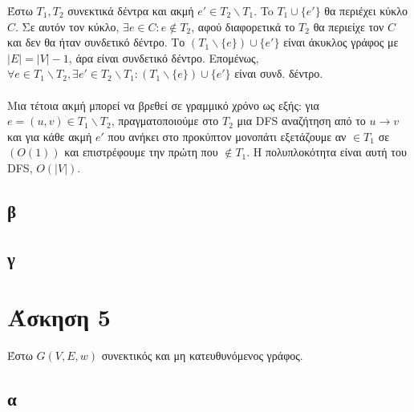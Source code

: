 \documentclass[12pt,a4paper]{article}
\begin{document}
  Έστω \(T_1, T_2\) συνεκτικά δέντρα και ακμή \(e' \in T_2 \backslash T_1\).
  To \(T_1 \cup \{e'\}\) θα περιέχει κύκλο \(C\). Σε αυτόν τον κύκλο, \(\exists
  e \in C: e \notin T_2\), αφού διαφορετικά το \(Τ_2\) θα περιείχε τον \(C\)
  και δεν θα ήταν συνδετικό δέντρο. Το \((T_1 \backslash \{e\}) \cup \{e'\} \)
  είναι άκυκλος γράφος με \(|E| = |V| - 1\), άρα είναι συνδετικό δέντρο.
  Επομένως, \(\forall e \in T_1 \backslash T_2, \exists e' \in T_2 \backslash
  T_1: (T_1 \backslash \{e\}) \cup \{e'\}\) είναι συνδ. δέντρο.
  \\
  \\
  Μια τέτοια ακμή μπορεί να βρεθεί σε γραμμικό χρόνο ως εξής: για \(e = (u, v)
  \in T_1 \backslash T_2 \), πραγματοποιούμε στο \(T_2 \) μια {\latintext DFS}
  αναζήτηση από το \(u \rightarrow v\) και για κάθε ακμή \(e'\) που ανήκει στο
  προκύπτον μονοπάτι εξετάζουμε αν \(\in Τ_1\) σε \((O(1))\) και επιστρέφουμε 
  την πρώτη που \(\notin T_1\). Η πολυπλοκότητα είναι αυτή του {\latintext DFS},
  \(O(|V|)\).
  
  \subsection{β}

  \subsection{γ}

  \section{Άσκηση 5}

  Έστω \(G(V, E, w)\) συνεκτικός και μη κατευθυνόμενος γράφος.

  \subsection{α}
\end{document}
